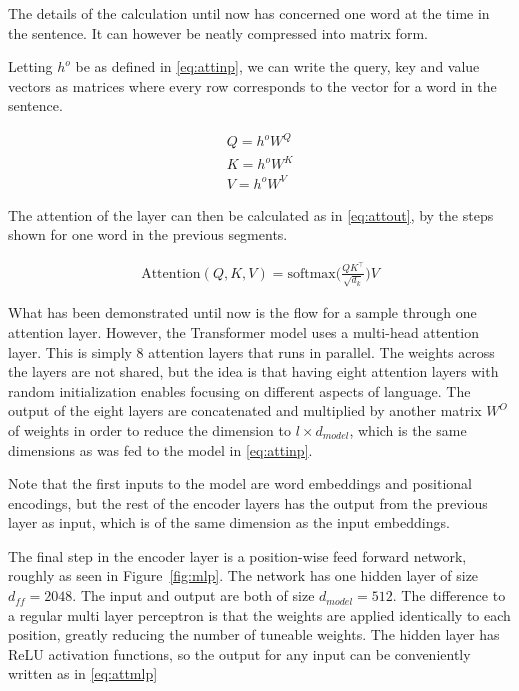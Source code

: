 The details of the calculation until now has concerned one word at the time in the sentence. It can however be neatly compressed into matrix form.

Letting $h^o$ be as defined in \ref{eq:attinp}, we can  write the query, key and value vectors as matrices where every row corresponds to the vector for a word in the sentence. 

\begin{align}
    Q = h^o W^Q \\
    K = h^o W^K \\
    V = h^o W^V
\end{align}

The attention of the layer can then be calculated as in \ref{eq:attout}, by the steps shown for one word in the previous segments. 

\begin{align}
    \text{Attention}(Q,K,V) = \text{softmax}\Big( \frac{Q K^\intercal}{\sqrt{d_k}}\Big) V
    \label{eq:attout}
\end{align}

What has been demonstrated until now is the flow for a sample through one attention layer. However, the Transformer model uses a multi-head attention layer. This is simply 8 attention layers that runs in parallel. The weights across the layers are not shared, but the idea is that having eight attention layers with random initialization enables focusing on different aspects of language. The output of the eight layers are concatenated and multiplied by another matrix $W^O$ of weights in order to reduce the dimension to $l \times d_{model}$, which is the same dimensions as was fed to the model in \ref{eq:attinp}. 

Note that the first inputs to the model are word embeddings and positional encodings, but the rest of the encoder layers has the output from the previous layer as input, which is of the same dimension as the input embeddings. 

The final step in the encoder layer is a position-wise feed forward network, roughly as seen in Figure~\ref{fig:mlp}. The network has one hidden layer of size $d_{ff} = 2048$. The input and output are both of size $d_{model} = 512$. The difference to a regular multi layer perceptron is that the weights are applied identically to each position, greatly reducing the number of tuneable weights. The hidden layer has ReLU activation functions, so the output for any input can be conveniently written as in \ref{eq:attmlp}


